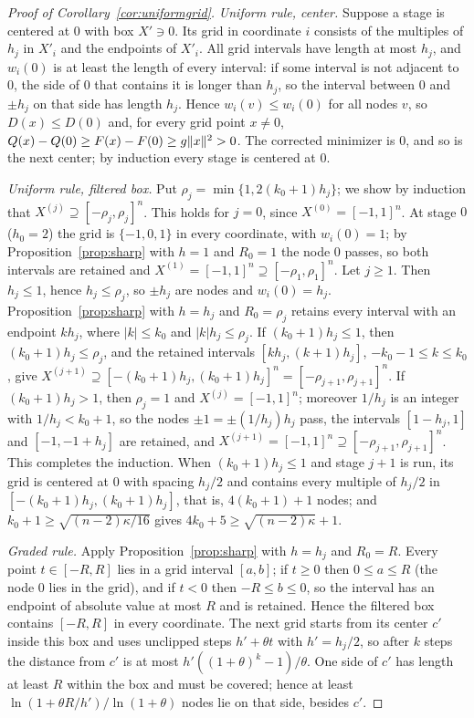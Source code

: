 \begin{proof}[Proof of Corollary~\ref{cor:uniformgrid}]
\emph{Uniform rule, center.} Suppose a stage is centered at $0$ with box
$X'\ni0$. Its grid in coordinate $i$ consists of the multiples of $h_j$ in
$X'_i$ and the endpoints of $X'_i$. All grid intervals have length at most
$h_j$, and $w_i(0)$ is at least the length of every interval: if some
interval is not adjacent to $0$, the side of $0$ that contains it is longer
than $h_j$, so the interval between $0$ and $\pm h_j$ on that side has length
$h_j$. Hence $w_i(v)\le w_i(0)$ for all nodes $v$, so $D(x)\le D(0)$ and, for
every grid point $x\ne0$, $Q(x)-Q(0)\ge F(x)-F(0)\ge g\lVert x\rVert^2>0$. The
corrected minimizer is $0$, and so is the next center; by induction every
stage is centered at $0$.

\emph{Uniform rule, filtered box.} Put $\rho_j=\min\{1,2(k_0+1)h_j\}$; we show
by induction that $X^{(j)}\supseteq[-\rho_j,\rho_j]^n$. This holds for $j=0$,
since $X^{(0)}=[-1,1]^n$. At stage $0$ ($h_0=2$) the grid is $\{-1,0,1\}$ in
every coordinate, with $w_i(0)=1$; by Proposition~\ref{prop:sharp} with $h=1$
and $R_0=1$ the node $0$ passes, so both intervals are retained and
$X^{(1)}=[-1,1]^n\supseteq[-\rho_1,\rho_1]^n$. Let $j\ge1$. Then $h_j\le1$,
hence $h_j\le\rho_j$, so $\pm h_j$ are nodes and $w_i(0)=h_j$.
Proposition~\ref{prop:sharp} with $h=h_j$ and $R_0=\rho_j$ retains every
interval with an endpoint $kh_j$, where $|k|\le k_0$ and $|k|h_j\le\rho_j$. If
$(k_0+1)h_j\le1$, then $(k_0+1)h_j\le\rho_j$, and the retained intervals
$[kh_j,(k+1)h_j]$, $-k_0-1\le k\le k_0$, give
$X^{(j+1)}\supseteq[-(k_0+1)h_j,(k_0+1)h_j]^n=[-\rho_{j+1},\rho_{j+1}]^n$. If
$(k_0+1)h_j>1$, then $\rho_j=1$ and $X^{(j)}=[-1,1]^n$; moreover $1/h_j$ is an
integer with $1/h_j<k_0+1$, so the nodes $\pm1=\pm(1/h_j)h_j$ pass, the
intervals $[1-h_j,1]$ and $[-1,-1+h_j]$ are retained, and
$X^{(j+1)}=[-1,1]^n\supseteq[-\rho_{j+1},\rho_{j+1}]^n$. This completes the
induction. When $(k_0+1)h_j\le1$ and stage $j+1$ is run, its grid is
centered at $0$ with spacing $h_j/2$ and contains every multiple of $h_j/2$ in
$[-(k_0+1)h_j,(k_0+1)h_j]$, that is, $4(k_0+1)+1$ nodes; and
$k_0+1\ge\sqrt{(n-2)\kappa/16}$ gives $4k_0+5\ge\sqrt{(n-2)\kappa}+1$.

\emph{Graded rule.} Apply Proposition~\ref{prop:sharp} with $h=h_j$ and
$R_0=R$. Every point $t\in[-R,R]$ lies in a grid interval $[a,b]$; if
$t\ge0$ then $0\le a\le R$ (the node $0$ lies in the grid), and if $t<0$ then
$-R\le b\le0$, so the interval has an endpoint of absolute value at most $R$
and is retained. Hence the filtered box contains $[-R,R]$ in every
coordinate. The next grid starts from its center $c'$ inside this box and
uses unclipped steps $h'+\theta t$ with $h'=h_j/2$, so after $k$ steps the
distance from $c'$ is at most $h'((1+\theta)^k-1)/\theta$. One side of $c'$
has length at least $R$ within the box and must be covered; hence at least
$\ln(1+\theta R/h')/\ln(1+\theta)$ nodes lie on that side, besides $c'$.
\end{proof}

